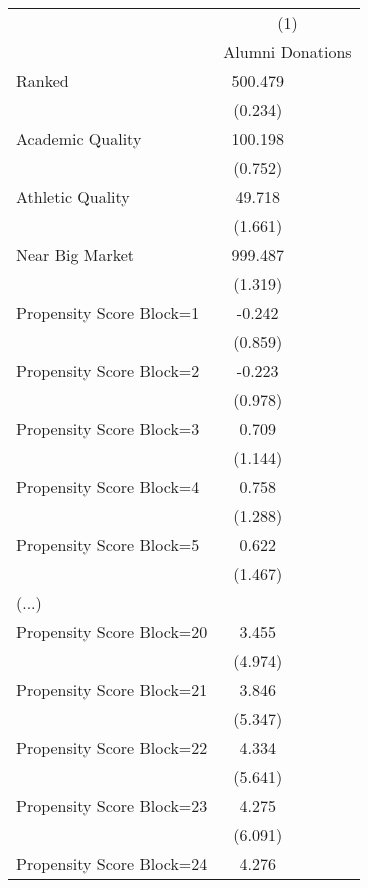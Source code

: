 \begin{tabular}{l*{4}{c}}
\hline\hline
                    &\multicolumn{4}{c}{(1)}\\
                    &\multicolumn{4}{c}{Alumni Donations}\\
\hline
Ranked              &     500.479\sym{***}\\
                    &       (0.234)         \\
Academic Quality    &     100.198\sym{***}\\
                    &       (0.752)        \\
Athletic Quality    &      49.718\sym{***}\\
                    &       (1.661)         \\
Near Big Market     &     999.487\sym{***}\\
                    &       (1.319)         \\
Propensity Score Block=1&      -0.242         \\
                    &       (0.859)         \\
Propensity Score Block=2&      -0.223         \\
                    &       (0.978)        \\
Propensity Score Block=3&       0.709         \\
                    &       (1.144)         \\
Propensity Score Block=4&       0.758         \\
                    &       (1.288)         \\
Propensity Score Block=5&       0.622         \\
                    &       (1.467)         \\
(...)\\
Propensity Score Block=20&       3.455         \\
                    &       (4.974)         \\
Propensity Score Block=21&       3.846         \\
                    &       (5.347)         \\
Propensity Score Block=22&       4.334         \\
                    &       (5.641)         \\
Propensity Score Block=23&       4.275         \\
                    &       (6.091)         \\
Propensity Score Block=24&       4.276         \\

\end{tabular}
